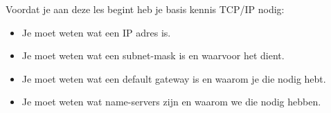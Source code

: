 Voordat je aan deze les begint heb je basis kennis TCP/IP nodig:
\begin{itemize}
\item Je moet weten wat een IP adres is.
\item Je moet weten wat een subnet-mask is en waarvoor het dient.
\item Je moet weten wat een default gateway is en waarom je die nodig hebt.
\item Je moet weten wat name-servers zijn en waarom we die nodig hebben.
\end{itemize}
